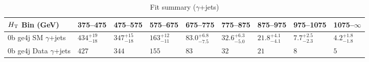 \documentclass[8pt]{article}
\def\scalht{\mbox{$H_{\rm{T}}$}\xspace}
\newcommand\T{\rule{0pt}{2.6ex}}
\begin{document}
\begin{table}[ht!]
\caption{Fit summary ($\gamma$+jets)}
\label{tab:ensemble-summary}
\centering
\begin{tabular}{ lllllllll }

\hline
\scalht Bin (GeV)       & 375--475                       & 475--575                       & 575--675                       & 675--775                       & 775--875                       & 875--975                       & 975--1075                      & 1075--$\infty$                 \\ [1.000000ex]
\hline
0b ge4j SM $\gamma$+jets\T & $434^{+19}_{-18}$              & $347^{+15}_{-18}$              & $163^{+12}_{-11}$              & $83.0^{+6.8}_{-7.5}$           & $32.6^{+6.3}_{-5.0}$           & $21.8^{+4.1}_{-4.1}$           & $7.7^{+2.5}_{-2.3}$            & $4.2^{+1.8}_{-1.8}$            \\ 
0b ge4j Data $\gamma$+jets\T & $427$                          & $344$                          & $155$                          & $83$                           & $32$                           & $21$                           & $8$                            & $5$                            \\ 
\hline

\end{tabular}
\end{table}
\end{document}
